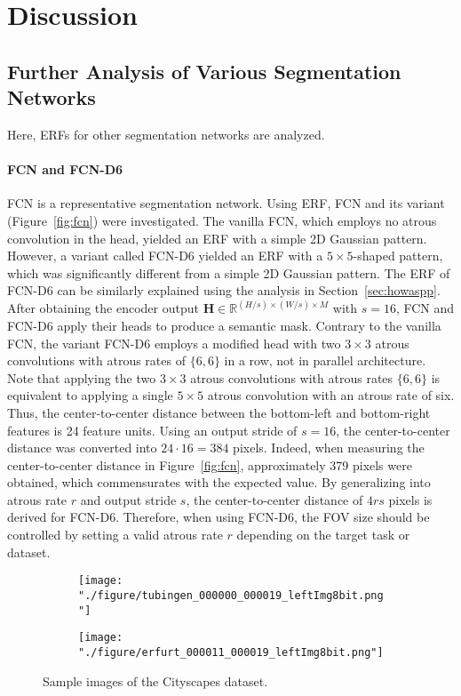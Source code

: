 \documentclass{article}
\newcommand{\R}{\mathbb{R}}
\newcommand{\bH}{\mathbf{H}}
\def\secref#1{Section~\ref{#1}}
\def\figref#1{Figure~\ref{#1}}
\begin{document}
\section{Discussion}
\label{sec:disc}

\subsection{Further Analysis of Various Segmentation Networks}
Here, ERFs for other segmentation networks are analyzed.

\paragraph{FCN and FCN-D6} FCN \citep{DBLP:journals/pami/ShelhamerLD17} is a representative segmentation network. Using ERF, FCN and its variant (\figref{fig:fcn}) were investigated. The vanilla FCN, which employs no atrous convolution in the head, yielded an ERF with a simple 2D Gaussian pattern. However, a variant called FCN-D6 yielded an ERF with a $5 \times 5$-shaped pattern, which was significantly different from a simple 2D Gaussian pattern. The ERF of FCN-D6 can be similarly explained using the analysis in \secref{sec:howaspp}. After obtaining the encoder output $\bH \in \R^{(H/s) \times (W/s) \times M}$ with $s=16$, FCN and FCN-D6 apply their heads to produce a semantic mask. Contrary to the vanilla FCN, the variant FCN-D6 employs a modified head with two $3 \times 3$ atrous convolutions with atrous rates of $\{6, 6\}$ in a row, not in parallel architecture. Note that applying the two $3 \times 3$ atrous convolutions with atrous rates $\{6, 6\}$ is equivalent to applying a single $5 \times 5$ atrous convolution with an atrous rate of six. Thus, the center-to-center distance between the bottom-left and bottom-right features is 24 feature units. Using an output stride of $s=16$, the center-to-center distance was converted into $24 \cdot 16 = 384$ pixels. Indeed, when measuring the center-to-center distance in \figref{fig:fcn}, approximately 379 pixels were obtained, which commensurates with the expected value. By generalizing into atrous rate $r$ and output stride $s$, the center-to-center distance of $4rs$ pixels is derived for FCN-D6. Therefore, when using FCN-D6, the FOV size should be controlled by setting a valid atrous rate $r$ depending on the target task or dataset.

\begin{figure}[t!]
	\centering
	\begin{subfigure}[b]{0.69\linewidth}
		\centering
		\texttt{[image: "./figure/tubingen\_000000\_000019\_leftImg8bit.png"]}
	\end{subfigure}
	\hfill
	\begin{subfigure}[b]{0.69\linewidth}
		\centering
		\texttt{[image: "./figure/erfurt\_000011\_000019\_leftImg8bit.png"]}
	\end{subfigure}
	\caption{Sample images of the Cityscapes dataset.}
	\label{fig:citysample}
\end{figure}
\end{document}
